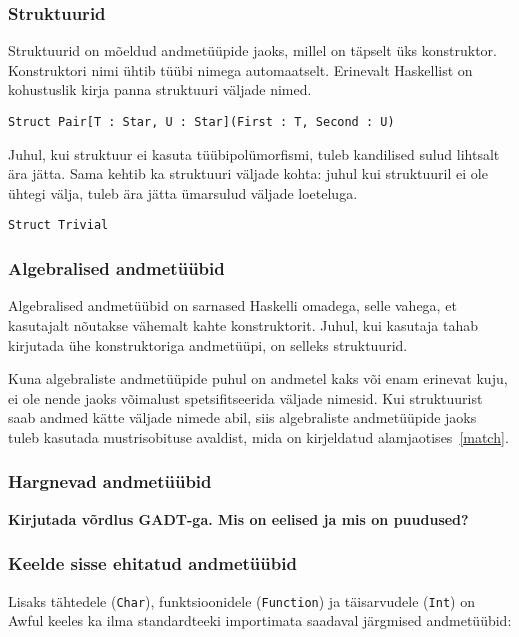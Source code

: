 \documentclass[12pt]{article}
\newcommand\markus[1]{\textcolor{roheline}{\textbf{#1}}}
\begin{document}
      \subsubsection{Struktuurid}
        Struktuurid on mõeldud andmetüüpide jaoks, millel on täpselt üks konstruktor. Konstruktori nimi ühtib tüübi nimega automaatselt. Erinevalt Haskellist on kohustuslik kirja panna struktuuri väljade nimed.

        \begin{verbatim}Struct Pair[T : Star, U : Star](First : T, Second : U)\end{verbatim}

        Juhul, kui struktuur ei kasuta tüübipolümorfismi, tuleb kandilised sulud lihtsalt ära jätta. Sama kehtib ka struktuuri väljade kohta: juhul kui struktuuril ei ole ühtegi välja, tuleb ära jätta ümarsulud väljade loeteluga.

        \begin{verbatim}Struct Trivial\end{verbatim}

      \subsubsection{Algebralised andmetüübid}
        Algebralised andmetüübid on sarnased Haskelli omadega, selle vahega, et kasutajalt nõutakse vähemalt kahte konstruktorit. Juhul, kui kasutaja tahab kirjutada ühe konstruktoriga andmetüüpi, on selleks struktuurid.

        Kuna algebraliste andmetüüpide puhul on andmetel kaks või enam erinevat kuju, ei ole nende jaoks võimalust spetsifitseerida väljade nimesid. Kui struktuurist saab andmed kätte väljade nimede abil, siis algebraliste andmetüüpide jaoks tuleb kasutada mustrisobituse avaldist, mida on kirjeldatud alamjaotises~\ref{match}.
      \subsubsection{Hargnevad andmetüübid}
        \markus{Kirjutada võrdlus GADT-ga. Mis on eelised ja mis on puudused?}
      \subsubsection{Keelde sisse ehitatud andmetüübid}\label{sisseehitatudalgebralised}
        Lisaks tähtedele (\verb!Char!), funktsioonidele (\verb!Function!) ja täisarvudele (\verb!Int!) on Awful keeles ka ilma standardteeki importimata saadaval järgmised andmetüübid:
\end{document}
